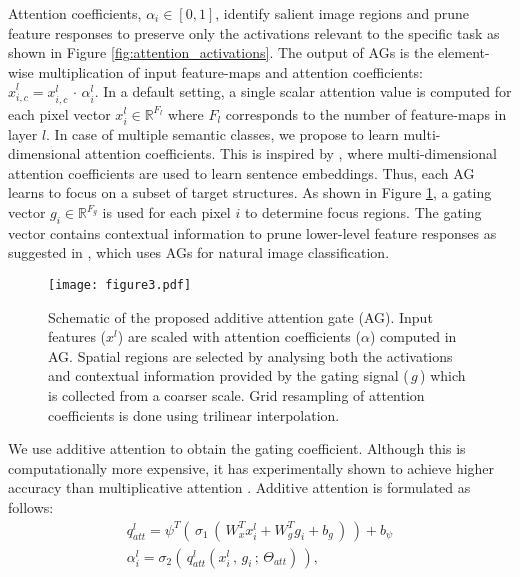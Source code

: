 \documentclass{article}
\newcommand{\R}[0]{\mathbb{R}} \newcommand\newsubcap[1]{\phantomcaption \caption*{\figurename~\thefigure(\thesubfigure): #1}}
\begin{document}
Attention coefficients, $\alpha_i \in [0,1]$, identify salient image regions and prune feature responses to preserve only the activations relevant to the specific task as shown in Figure \ref{fig:attention_activations}. The output of AGs is the element-wise multiplication of input feature-maps and attention coefficients: $\hat{x}_{i,c}^l = x_{i,c}^l \,\cdot\, \alpha_{i}^l$. In a default setting, a single scalar attention value is computed for each pixel vector $x_{i}^l \in \R^{F_l}$ where $F_l$ corresponds to the number of feature-maps in layer $l$. In case of multiple semantic classes, we propose to learn multi-dimensional attention coefficients. This is inspired by \cite{shen2017disan}, where multi-dimensional attention coefficients are used to learn sentence embeddings. Thus, each AG learns to focus on a subset of target structures. As shown in Figure \ref{fig:attentionblock}, a gating vector $g_i \in \R^{F_g}$ is used for each pixel $i$ to determine focus regions. The gating vector contains contextual information to prune lower-level feature responses as suggested in \cite{wang2017residual}, which uses AGs for natural image classification.
\begin{figure}[!t]
	\centering
	\texttt{[image: figure3.pdf]}
	\caption{Schematic of the proposed additive attention gate (AG). Input features ($x^l$) are scaled with attention coefficients ($\alpha$) computed in AG. Spatial regions are selected by analysing both the activations and contextual information provided by the gating signal ($\,g\,$) which is collected from a coarser scale. Grid resampling of attention coefficients is done using trilinear interpolation.}
	\label{fig:attentionblock}
\end{figure}
We use additive attention \cite{bahdanau2014neural} to obtain the gating coefficient. Although this is computationally more expensive, it has experimentally shown to achieve higher accuracy than multiplicative attention \cite{luong2015effective}. Additive attention is formulated as follows: 
\begin{gather}
q^l_{att} = \psi^T \left(\, \sigma_1\,(\,W_x^T x_i^l + W_g^T g_i + b_g\,)\,\right) + b_{\psi} \\
\alpha_i^l = \sigma_2 (\, q^l_{att}(x_{i}^l\,,\, g_i \,;\, \Theta_{att}) \,), 
\end{gather}
\end{document}

